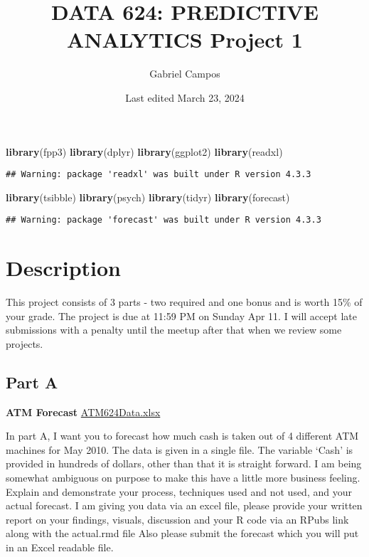 \documentclass[
]{article}
\title{DATA 624: PREDICTIVE ANALYTICS Project 1}
\author{Gabriel Campos}
\date{Last edited March 23, 2024}
\newenvironment{Shaded}{\begin{snugshade}}{\end{snugshade}}
\newcommand{\FunctionTok}[1]{\textcolor[rgb]{0.13,0.29,0.53}{\textbf{#1}}}
\newcommand{\NormalTok}[1]{#1}
\begin{document}
\maketitle

\begin{Shaded}
\begin{Highlighting}[]
\FunctionTok{library}\NormalTok{(fpp3)}
\FunctionTok{library}\NormalTok{(dplyr)}
\FunctionTok{library}\NormalTok{(ggplot2)}
\FunctionTok{library}\NormalTok{(readxl)}
\end{Highlighting}
\end{Shaded}

\begin{verbatim}
## Warning: package 'readxl' was built under R version 4.3.3
\end{verbatim}

\begin{Shaded}
\begin{Highlighting}[]
\FunctionTok{library}\NormalTok{(tsibble)}
\FunctionTok{library}\NormalTok{(psych)}
\FunctionTok{library}\NormalTok{(tidyr)}
\FunctionTok{library}\NormalTok{(forecast)}
\end{Highlighting}
\end{Shaded}

\begin{verbatim}
## Warning: package 'forecast' was built under R version 4.3.3
\end{verbatim}

\hypertarget{description}{%
\section{Description}\label{description}}

This project consists of 3 parts - two required and one bonus and is
worth 15\% of your grade. The project is due at 11:59 PM on Sunday Apr
11. I will accept late submissions with a penalty until the meetup after
that when we review some projects.

\hypertarget{part-a}{%
\subsection{Part A}\label{part-a}}

\textbf{ATM Forecast}
\href{https://bbhosted.cuny.edu/bbcswebdav/pid-81630946-dt-content-rid-636012399_1/xid-636012399_1}{ATM624Data.xlsx}

In part A, I want you to forecast how much cash is taken out of 4
different ATM machines for May 2010. The data is given in a single file.
The variable `Cash' is provided in hundreds of dollars, other than that
it is straight forward. I am being somewhat ambiguous on purpose to make
this have a little more business feeling. Explain and demonstrate your
process, techniques used and not used, and your actual forecast. I am
giving you data via an excel file, please provide your written report on
your findings, visuals, discussion and your R code via an RPubs link
along with the actual.rmd file Also please submit the forecast which you
will put in an Excel readable file.
\end{document}
